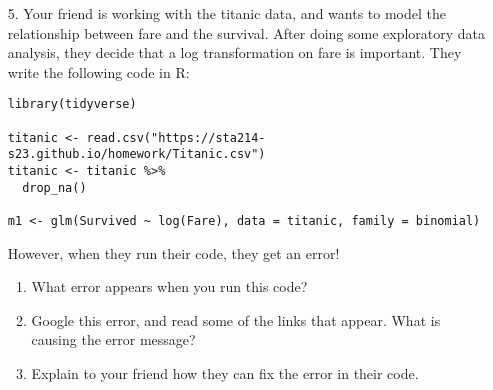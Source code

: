 \documentclass[11pt]{article}
\begin{document}
\begin{enumerate}
\item[5.] Your friend is working with the titanic data, and wants to model the relationship between fare and the survival. After doing some exploratory data analysis, they decide that a log transformation on fare is important. They write the following code in R:

\begin{verbatim}
library(tidyverse)

titanic <- read.csv("https://sta214-s23.github.io/homework/Titanic.csv")
titanic <- titanic %>%
  drop_na()
  
m1 <- glm(Survived ~ log(Fare), data = titanic, family = binomial)
\end{verbatim}

However, when they run their code, they get an error!

\begin{enumerate}
\item What error appears when you run this code?

\item Google this error, and read some of the links that appear. What is causing the error message?

\item Explain to your friend how they can fix the error in their code.
\end{enumerate}

\end{enumerate}
\end{document}
